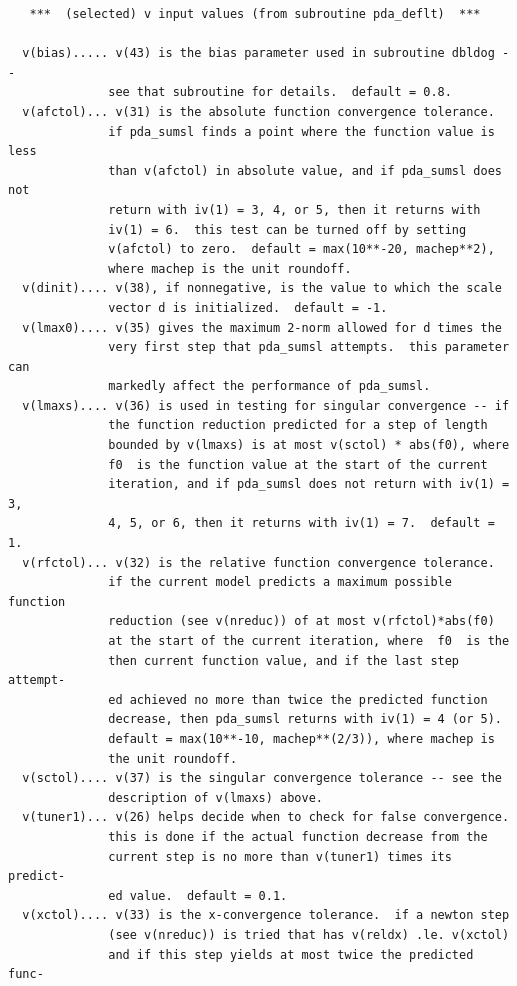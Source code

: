 \documentclass[11pt,twoside]{article}
\begin{document}
\begin{verbatim}
   ***  (selected) v input values (from subroutine pda_deflt)  ***

  v(bias)..... v(43) is the bias parameter used in subroutine dbldog --
              see that subroutine for details.  default = 0.8.
  v(afctol)... v(31) is the absolute function convergence tolerance.
              if pda_sumsl finds a point where the function value is less
              than v(afctol) in absolute value, and if pda_sumsl does not
              return with iv(1) = 3, 4, or 5, then it returns with
              iv(1) = 6.  this test can be turned off by setting
              v(afctol) to zero.  default = max(10**-20, machep**2),
              where machep is the unit roundoff.
  v(dinit).... v(38), if nonnegative, is the value to which the scale
              vector d is initialized.  default = -1.
  v(lmax0).... v(35) gives the maximum 2-norm allowed for d times the
              very first step that pda_sumsl attempts.  this parameter can
              markedly affect the performance of pda_sumsl.
  v(lmaxs).... v(36) is used in testing for singular convergence -- if
              the function reduction predicted for a step of length
              bounded by v(lmaxs) is at most v(sctol) * abs(f0), where
              f0  is the function value at the start of the current
              iteration, and if pda_sumsl does not return with iv(1) = 3,
              4, 5, or 6, then it returns with iv(1) = 7.  default = 1.
  v(rfctol)... v(32) is the relative function convergence tolerance.
              if the current model predicts a maximum possible function
              reduction (see v(nreduc)) of at most v(rfctol)*abs(f0)
              at the start of the current iteration, where  f0  is the
              then current function value, and if the last step attempt-
              ed achieved no more than twice the predicted function
              decrease, then pda_sumsl returns with iv(1) = 4 (or 5).
              default = max(10**-10, machep**(2/3)), where machep is
              the unit roundoff.
  v(sctol).... v(37) is the singular convergence tolerance -- see the
              description of v(lmaxs) above.
  v(tuner1)... v(26) helps decide when to check for false convergence.
              this is done if the actual function decrease from the
              current step is no more than v(tuner1) times its predict-
              ed value.  default = 0.1.
  v(xctol).... v(33) is the x-convergence tolerance.  if a newton step
              (see v(nreduc)) is tried that has v(reldx) .le. v(xctol)
              and if this step yields at most twice the predicted func-

\end{verbatim}
\end{document}
